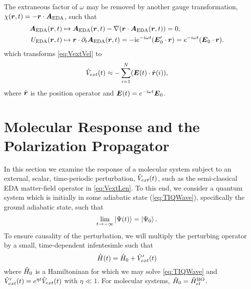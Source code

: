 The extraneous factor of $\omega$ may be removed by another gauge transformation, $\chi(\boldsymbol{r},t) = -\boldsymbol{r} \cdot \boldsymbol{A}_\mathrm{EDA}$,
such that
\begin{align}
  \boldsymbol{A}_\mathrm{EDA}(\boldsymbol{r}, t) &\mapsto \boldsymbol{A}_\mathrm{EDA}(\boldsymbol{r}, t) - \nabla (\boldsymbol{r} \cdot \boldsymbol{A}_\mathrm{EDA}(\boldsymbol{r},t))  = 0, \\
  U_\mathrm{EDA}(\boldsymbol{r},t)  &\mapsto \boldsymbol{r} \cdot \partial_t \boldsymbol{A}_\mathrm{EDA}(\boldsymbol{r},t) = -\mathrm i e^{-i \omega t} (\boldsymbol{E}'_0 \cdot \boldsymbol{r}) =  e^{-i \omega t}(\boldsymbol{E}_0 \cdot \boldsymbol{r}).
\end{align}
which transforms \cref{eq:VextVel} to
\begin{equation}
\label{eq:VextLen}
\hat{V}_{ext}(t) \approx -\sum_{i=1}^N ( \boldsymbol{E}(t) \cdot \hat{\boldsymbol{r}}(i) ),
\end{equation}
where $\hat{\boldsymbol{r}}$ is the position operator and $\boldsymbol{E}(t) = e^{-\mathrm i\omega t}\boldsymbol{E}_0$.

\section{Molecular Response and the Polarization Propagator}
\label{sec:PolarProp}

In this section we examine the response of a molecular system subject to an external, scalar, time-periodic perturbation, 
$\hat{V}_{ext}(t)$, such as the semi-classical EDA matter-field operator in \cref{eq:VextLen}. 
To this end, we consider a
quantum system which is initially in some adiabatic state (\cref{eq:TIQWave}), specifically the ground adiabatic state,
such that
\begin{equation}
\lim_{t \rightarrow -\infty} \left\vert \Psi (t) \right\rangle = \left\vert \Psi_0 \right\rangle.
\end{equation}
To ensure causality of the perturbation, we will multiply the perturbing operator by a small, time-dependent infentesimle
 such that
\begin{equation}
\hat{H}(t) = \hat{H}_0 + \hat{V}'_{ext}(t)
\end{equation}
where $\hat{H}_0$ is a Hamiltoninan for which we may solve \cref{eq:TIQWave} and 
$\hat{V}'_{ext}(t) = e^{\eta t } \hat{V}_{ext}(t)$ with $\eta \ll 1$. For molecular systems, $\hat{H}_0 = \hat{H}^{\mathrm{BO}}_{el}$.

